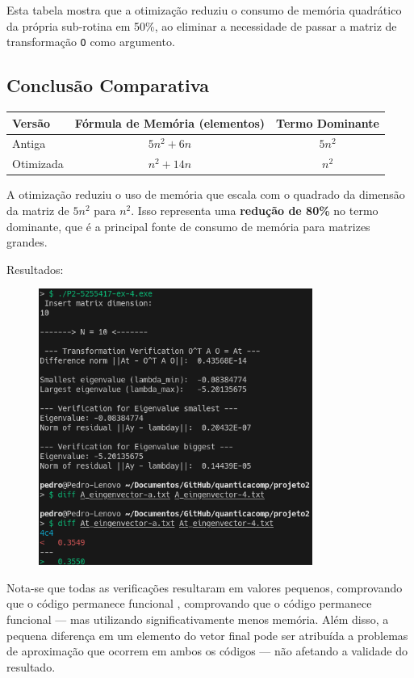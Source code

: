 \documentclass[12pt, a4paper]{article} %
\begin{document}
                Esta tabela mostra que a otimiza\c{c}\~ao reduziu o consumo de mem\'oria quadr\'atico da pr\'opria sub-rotina em 50\%, ao eliminar a necessidade de passar a matriz de transforma\c{c}\~ao \texttt{O} como argumento.

            \subsection*{Conclus\~ao Comparativa}

            \begin{table}[h!]
            \centering
            \begin{tabular}{|l|c|c|}
            \hline
            \textbf{Vers\~ao} & \textbf{F\'ormula de Mem\'oria (elementos)} & \textbf{Termo Dominante} \\
            \hline
            Antiga & $5n^2 + 6n$ & $5n^2$ \\
            Otimizada & $n^2 + 14n$ & $n^2$ \\
            \hline
            \end{tabular}
            \end{table}

            A otimiza\c{c}\~ao reduziu o uso de mem\'oria que escala com o quadrado da dimens\~ao da matriz de $5n^2$ para $n^2$. Isso representa uma \textbf{redu\c{c}\~ao de 80\%} no termo dominante, que \'e a principal fonte de consumo de mem\'oria para matrizes grandes.

        Resultados:
        \begin{figure}[H]
            \centering
            \includegraphics[width=0.8\textwidth]{../images/ex4.png}
        \end{figure}

        Nota-se que todas as verifica\c{c}\~oes resultaram em valores pequenos, comprovando que o c\'odigo permanece funcional , comprovando que o c\'odigo permanece funcional ---  mas utilizando significativamente menos mem\'oria. Al\'em disso, a pequena diferen\c{c}a em um elemento do vetor final pode ser atribu\'ida a problemas de aproxima\c{c}\~ao que ocorrem em ambos os c\'odigos --- n\~ao afetando a validade do resultado.
\end{document}
